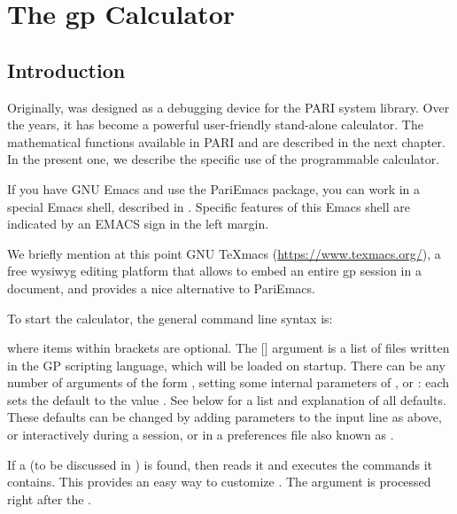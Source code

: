 %
%
\chapter{The gp Calculator}

\section{Introduction}

Originally,  was designed as a debugging device for the PARI system
library. Over the years, it has become a powerful user-friendly stand-alone
calculator. The mathematical functions available in PARI and  are
described in the next chapter. In the present one, we describe the specific
use of the  programmable calculator.

\emacs If you have GNU Emacs and use the PariEmacs package, you can work in a
special Emacs shell, described in . Specific features of
this Emacs shell are indicated by an EMACS sign in the left margin.

We briefly mention at this point GNU
TeXmacs (\url{https://www.texmacs.org/}), a free wysiwyg editing
platform that allows to embed an entire gp session in a document, and
provides a nice alternative to PariEmacs.


To start the calculator, the general command line syntax is:


\noindent
where items within brackets are optional. The [] argument is a
list of files written in the GP scripting language, which will be loaded on
startup. There can be any number of arguments of the form
, setting some internal parameters of ,
or : each sets the default  to the value . See
 below for a list and explanation of all defaults. These
defaults can be changed by adding parameters to the input line as above, or
interactively during a  session, or in a preferences file also known
as .

If a  (to be discussed in ) is
found,  then reads it and executes the commands it contains. This
provides an easy way to customize . The  argument is
processed right after the .

